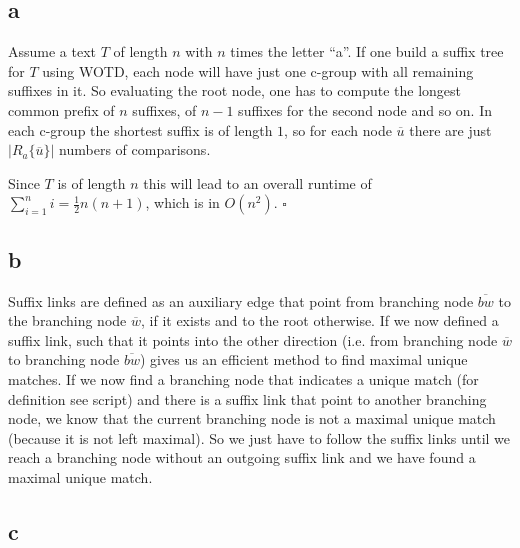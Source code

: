 \documentclass[%
   10pt,              %
   ngerman,           %
   a4paper,           %
   DIV11,             %
]{scrartcl}%
\begin{document}
\subsection*{a}
Assume a text $T$ of length $n$ with $n$ times the letter ``a''. If one build a suffix tree for $T$ 
using WOTD, each node will have just one c-group with all remaining suffixes in it. So evaluating the 
root node, one has to compute the longest common prefix of $n$ suffixes, of $n-1$ suffixes for the 
second node and so on. In each c-group the shortest suffix is of length $1$, so for each node $\overline{u}$ 
there are just $|R_a\{\overline{u}\}|$ numbers of comparisons.

Since $T$ is of length $n$ this will lead to an overall runtime of $\sum_{i=1}^{n}i = \frac{1}{2}n(n+1)$, 
which is in $O(n^2)$. $\square$


\subsection*{b}
Suffix links are defined as an auxiliary edge that point from branching node $\overline{bw}$ to the branching 
node $\overline{w}$, if it exists and to the root otherwise. If we now defined a suffix link, such that it 
points into the other direction (i.e. from branching node $\overline{w}$ to branching node $\overline{bw}$) gives 
us an efficient method to find maximal unique matches. If we now find a branching node that indicates 
a unique match (for definition see script) and there is a suffix link that point to another branching node, we know that the current 
branching node is not a maximal unique match (because it is not left maximal). So we just have to 
follow the suffix links until we reach a branching node without an outgoing suffix link and we have 
found a maximal unique match.


\subsection*{c}
\end{document}
